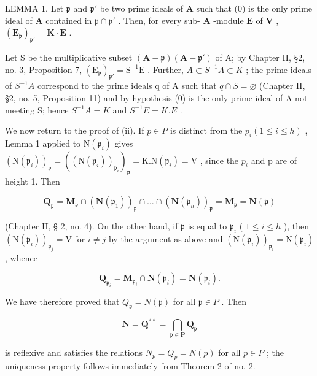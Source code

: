LEMMA 1. Let \(\mathfrak{p}\) and \(\mathfrak{p}'\) be two prime ideals of \(\mathbf{A}\) such that (0) is the only prime ideal of \(\mathbf{A}\) contained in \(\mathfrak{p} \cap \mathfrak{p}'\) . Then, for every sub- \(\mathbf{A}\) -module \(\mathbf{E}\) of \(\mathbf{V}\) , \((\mathbf{E}_{\mathfrak{p}})_{\mathfrak{p}'} = \mathbf{K} \cdot \mathbf{E}\) .

Let S be the multiplicative subset \((\mathbf{A}-\mathfrak{p})(\mathbf{A}-\mathfrak{p}')\) of A; by Chapter II, §2, no. 3, Proposition 7, \((\mathrm{E}_{\mathfrak{p}})_{\mathfrak{p}'}=\mathrm{S}^{-1}\mathrm{E}\) . Further, \(A\subset S^{-1}A\subset K\) ; the prime ideals of \(S^{-1}A\) correspond to the prime ideals q of A such that \(q\cap S=\varnothing\) (Chapter II, §2, no. 5, Proposition 11) and by hypothesis (0) is the only prime ideal of A not meeting S; hence \(S^{-1}A=K\) and \(S^{-1}E=K.E\) .

We now return to the proof of (ii). If \(p \in P\) is distinct from the \(p_i (1 \leqslant i \leqslant h)\) , Lemma 1 applied to \(\mathrm{N}(\mathfrak{p}_i)\) gives \((\mathrm{N}(\mathfrak{p}_i))_{\mathfrak{p}} = ((\mathrm{N}(\mathfrak{p}_i))_{\mathfrak{p}_i})_{\mathfrak{p}} = \mathrm{K}. \mathrm{N}(\mathfrak{p}_i) = \mathrm{V}\) , since the \(p_i\) and p are of height 1. Then

\[
\mathbf {Q} _ {\mathfrak {p}} = \mathbf {M} _ {\mathfrak {p}} \cap (\mathbf {N} (\mathfrak {p} _ {1})) _ {\mathfrak {p}} \cap \dots \cap (\mathbf {N} (\mathfrak {p} _ {h})) _ {\mathfrak {p}} = \mathbf {M} _ {\mathfrak {p}} = \mathbf {N} (\mathfrak {p})
\]

(Chapter II, § 2, no. 4). On the other hand, if \(\mathfrak{p}\) is equal to \(\mathfrak{p}_i\) ( \(1 \leqslant i \leqslant h\) ), then \((\mathrm{N}(\mathfrak{p}_i))_{\mathfrak{p}_j} = \mathrm{V}\) for \(i \neq j\) by the argument as above and \((\mathrm{N}(\mathfrak{p}_i))_{\mathfrak{p}_i} = \mathrm{N}(\mathfrak{p}_i)\) , whence

\[
\mathbf {Q} _ {\mathfrak {p} _ {i}} = \mathbf {M} _ {\mathfrak {p} _ {i}} \cap \mathbf {N} (\mathfrak {p} _ {i}) = \mathbf {N} (\mathfrak {p} _ {i}).
\]

We have therefore proved that \(Q_{\mathfrak{p}} = N(\mathfrak{p})\) for all \(\mathfrak{p} \in P\) . Then

\[
\mathbf {N} = \mathbf {Q} ^ {* *} = \bigcap_ {\mathfrak {p} \in \mathbf {P}} \mathbf {Q} _ {\mathfrak {p}}
\]

is reflexive and satisfies the relations \(N_{p} = Q_{p} = N(p)\) for all \(p \in P\) ; the uniqueness property follows immediately from Theorem 2 of no. 2.


